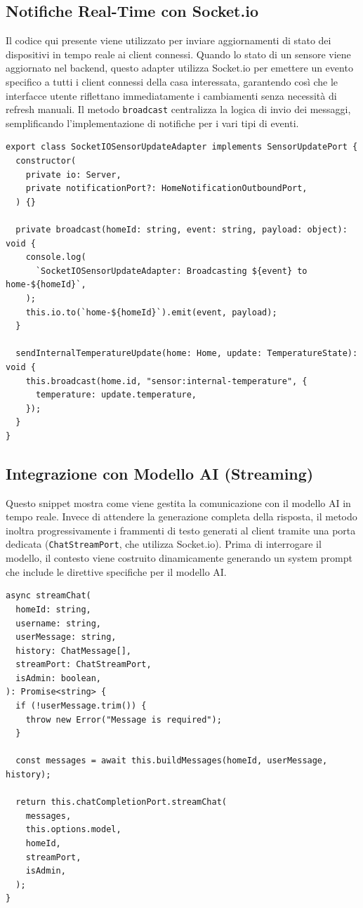 \documentclass[a4paper,12pt]{article}
\begin{document}
\subsection{Notifiche Real-Time con Socket.io}
Il codice qui presente viene utilizzato per inviare aggiornamenti di stato dei dispositivi in tempo reale ai client connessi. Quando lo stato di un sensore viene aggiornato nel backend, questo adapter utilizza Socket.io per emettere un evento specifico a tutti i client connessi della casa interessata, garantendo così che le interfacce utente riflettano immediatamente i cambiamenti senza necessità di refresh manuali. Il metodo \texttt{broadcast} centralizza la logica di invio dei messaggi, semplificando l'implementazione di notifiche per i vari tipi di eventi.
\begin{lstlisting}
export class SocketIOSensorUpdateAdapter implements SensorUpdatePort {
  constructor(
    private io: Server,
    private notificationPort?: HomeNotificationOutboundPort,
  ) {}

  private broadcast(homeId: string, event: string, payload: object): void {
    console.log(
      `SocketIOSensorUpdateAdapter: Broadcasting ${event} to home-${homeId}`,
    );
    this.io.to(`home-${homeId}`).emit(event, payload);
  }

  sendInternalTemperatureUpdate(home: Home, update: TemperatureState): void {
    this.broadcast(home.id, "sensor:internal-temperature", {
      temperature: update.temperature,
    });
  }
}
\end{lstlisting}

\subsection{Integrazione con Modello AI (Streaming)}
Questo snippet mostra come viene gestita la comunicazione con il modello AI in tempo reale. Invece di attendere la generazione completa della risposta, il metodo inoltra progressivamente i frammenti di testo generati al client tramite una porta dedicata (\texttt{ChatStreamPort}, che utilizza Socket.io). Prima di interrogare il modello, il contesto viene costruito dinamicamente generando un system prompt che include le direttive specifiche per il modello AI.
\begin{lstlisting}
async streamChat(
  homeId: string,
  username: string,
  userMessage: string,
  history: ChatMessage[],
  streamPort: ChatStreamPort,
  isAdmin: boolean,
): Promise<string> {
  if (!userMessage.trim()) {
    throw new Error("Message is required");
  }

  const messages = await this.buildMessages(homeId, userMessage, history);

  return this.chatCompletionPort.streamChat(
    messages,
    this.options.model,
    homeId,
    streamPort,
    isAdmin,
  );
}
\end{lstlisting}
\end{document}
